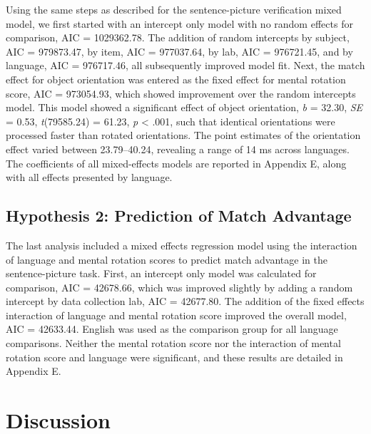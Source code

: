 \documentclass[
  man,floatsintext]{apa7}
\begin{document}
Using the same steps as described for the sentence-picture verification
mixed model, we first started with an intercept only model with no
random effects for comparison, AIC =
1029362.78. The
addition of random intercepts by subject, AIC =
979873.47, by item,
AIC = 977037.64, by
lab, AIC = 976721.45,
and by language, AIC =
976717.46, all
subsequently improved model fit. Next, the match effect for object
orientation was entered as the fixed effect for mental rotation score,
AIC = 973054.93,
which showed improvement over the random intercepts model. This model
showed a significant effect of object orientation, \emph{b} =
32.30, \emph{SE} =
0.53,
\emph{t}(79585.24) =
61.23, \emph{p}
\textless{} .001, such that identical orientations were
processed faster than rotated orientations. The point estimates of the
orientation effect varied between 23.79--40.24, revealing a range of 14
ms across languages. The coefficients of all mixed-effects models are
reported in Appendix E, along with all effects presented by language.

\hypertarget{hypothesis-2-prediction-of-match-advantage}{%
\subsection{Hypothesis 2: Prediction of Match Advantage}\label{hypothesis-2-prediction-of-match-advantage}}

The last analysis included a mixed effects regression model using the
interaction of language and mental rotation scores to predict match
advantage in the sentence-picture task. First, an intercept only model
was calculated for comparison, AIC =
42678.66, which
was improved slightly by adding a random intercept by data collection
lab, AIC = 42677.80. The
addition of the fixed effects interaction of language and mental
rotation score improved the overall model, AIC =
42633.44. English
was used as the comparison group for all language comparisons. Neither
the mental rotation score nor the interaction of mental rotation score
and language were significant, and these results are detailed in
Appendix E.

\hypertarget{discussion}{%
\section{Discussion}\label{discussion}}
\end{document}
